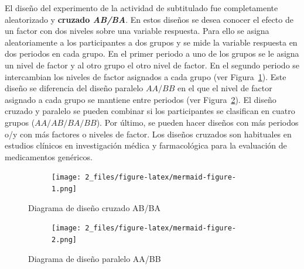 \documentclass[
  12pt,
  a4paper,
  extrafontsizes,
  onecolumn,
  openright,
  table]{memoir}
\begin{document}
El diseño del experimento de la actividad de subtitulado fue
completamente aleatorizado y \textbf{cruzado \emph{AB/BA}}. En estos
diseños se desea conocer el efecto de un factor con dos niveles sobre
una variable respuesta. Para ello se asigna aleatoriamente a los
participantes a dos grupos y se mide la variable respuesta en dos
periodos en cada grupo. En el primer periodo a uno de los grupos se le
asigna un nivel de factor y al otro grupo el otro nivel de factor. En el
segundo periodo se intercambian los niveles de factor asignados a cada
grupo (ver Figura~\ref{fig-ab-ba}). Este diseño se diferencia del diseño
paralelo \(AA/BB\) en el que el nivel de factor asignado a cada grupo se
mantiene entre periodos (ver Figura~\ref{fig-aa-bb}). El
\gls{diseño cruzado} y paralelo se pueden combinar si los participantes
se clasifican en cuatro grupos (\(AA/AB/BA/BB\)). Por último, se pueden
hacer diseños con más periodos o/y con más factores o niveles de factor.
Los diseños cruzados son habituales en estudios clínicos en
investigación médica \autocite[ver][]{lim2021} y farmacológica para la
evaluación de medicamentos genéricos.

\begin{figure}

{\centering 

\begin{figure}[H]

{\centering \texttt{[image: 2\_files/figure-latex/mermaid-figure-1.png]}

}

\end{figure}

}

\caption{\label{fig-ab-ba}Diagrama de diseño cruzado AB/BA}

\end{figure}

\begin{figure}

{\centering 

\begin{figure}[H]

{\centering \texttt{[image: 2\_files/figure-latex/mermaid-figure-2.png]}

}

\end{figure}

}

\caption{\label{fig-aa-bb}Diagrama de diseño paralelo AA/BB}

\end{figure}
\end{document}
